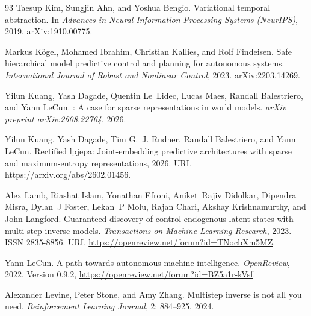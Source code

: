 \begin{thebibliography}{93}
Taesup Kim, Sungjin Ahn, and Yoshua Bengio.
\newblock Variational temporal abstraction.
\newblock In \emph{Advances in Neural Information Processing Systems
  (NeurIPS)}, 2019.
\newblock arXiv:1910.00775.

Markus K{\"o}gel, Mohamed Ibrahim, Christian Kallies, and Rolf Findeisen.
\newblock Safe hierarchical model predictive control and planning for
  autonomous systems.
\newblock \emph{International Journal of Robust and Nonlinear Control}, 2023.
\newblock arXiv:2203.14269.

Yilun Kuang, Yash Dagade, Quentin Le~Lidec, Lucas Maes, Randall Balestriero,
  and Yann LeCun.
: A case for sparse representations in world models.
\newblock \emph{arXiv preprint arXiv:2608.22764}, 2026{}.

Yilun Kuang, Yash Dagade, Tim G.~J. Rudner, Randall Balestriero, and Yann
  LeCun.
\newblock Rectified lpjepa: Joint-embedding predictive architectures with
  sparse and maximum-entropy representations, 2026{}.
\newblock URL \url{https://arxiv.org/abs/2602.01456}.

Alex Lamb, Riashat Islam, Yonathan Efroni, Aniket~Rajiv Didolkar, Dipendra
  Misra, Dylan~J Foster, Lekan~P Molu, Rajan Chari, Akshay Krishnamurthy, and
  John Langford.
\newblock Guaranteed discovery of control-endogenous latent states with
  multi-step inverse models.
\newblock \emph{Transactions on Machine Learning Research}, 2023.
\newblock ISSN 2835-8856.
\newblock URL \url{https://openreview.net/forum?id=TNocbXm5MZ}.

Yann LeCun.
\newblock A path towards autonomous machine intelligence.
\newblock \emph{OpenReview}, 2022.
\newblock Version 0.9.2, \url{https://openreview.net/forum?id=BZ5a1r-kVsf}.

Alexander Levine, Peter Stone, and Amy Zhang.
\newblock Multistep inverse is not all you need.
\newblock \emph{Reinforcement Learning Journal}, 2: 884--925, 2024.


\end{thebibliography}
